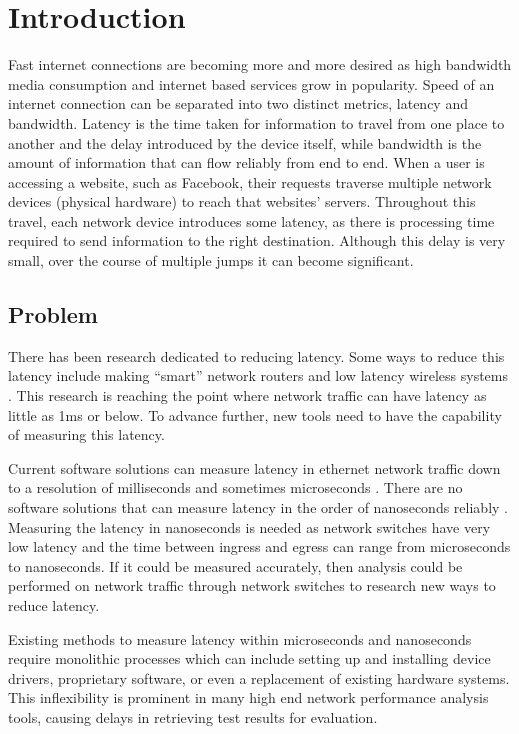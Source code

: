 \chapter{Introduction}\label{C:intro}

\par Fast internet connections are becoming more and more desired as high bandwidth media consumption and internet based services grow in popularity. 
Speed of an internet connection can be separated into two distinct metrics, latency and bandwidth. 
Latency is the time taken for information to travel from one place to another and the delay introduced by the device itself, while bandwidth is the amount of information that can flow reliably from end to end.
When a user is accessing a website, such as Facebook, their requests traverse multiple network devices
(physical hardware) to reach that websites’ servers. Throughout this travel, each network device
introduces some latency, as there is processing time required to send information to the right
destination. Although this delay is very small, over the course of multiple jumps it can become
significant.

\section{Problem}

\par There has been research dedicated to reducing latency. Some ways to reduce this latency include making “smart” network routers \cite{smartrouters} and low latency wireless systems \cite{5g}. 
This research is reaching the point where network traffic can have latency as little as 1ms \cite{lessthan1ms} or below.
To advance further, new tools need to have the capability of measuring this latency.

\par Current software solutions can measure latency in ethernet network traffic down to a resolution of
milliseconds and sometimes microseconds \cite{pingisbad}. There are no software solutions that can measure
latency in the order of nanoseconds reliably \cite{timeinlinux}. Measuring the latency in nanoseconds is needed as
network switches have very low latency and the time between ingress and egress can range from
microseconds to nanoseconds. If it could be measured accurately, then analysis could be performed
on network traffic through network switches to research new ways to reduce latency.

\par Existing methods to measure latency within microseconds and nanoseconds require monolithic processes which can
include setting up and installing device drivers, proprietary software, or even a replacement of existing hardware systems.
This inflexibility is prominent in many high end network performance analysis tools, causing delays in retrieving test results for evaluation.

